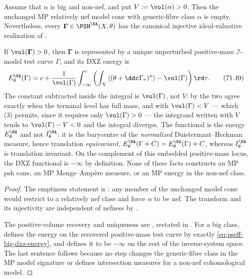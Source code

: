 \begin{proposition}\label{prop:pseff-big-nonnef-surviving-core}
Assume that \(\alpha\) is big and non-nef, and put
\(V:=\vol(\alpha)>0\).  Then the unchanged MP relatively nef model cone
with generic-fibre class \(\alpha\) is empty.  Nevertheless, every
\(\boldsymbol\Gamma\in\PSH^{\NA}(X,\theta)\) has the canonical injective
ideal-valuative realization of
.

If \(\vol(\boldsymbol\Gamma)>0\), then
\(\boldsymbol\Gamma\) is represented by a unique unperturbed
positive-mass \(\mathcal I\)-model test curve \(\Gamma\), and its DXZ
energy is
\[
 E_\theta^{\NA}(\Gamma)
 =c+\frac1{\vol(\Gamma)}\int_{-\infty}^{c}
   \left(
    \int_X\left\langle
       (\theta+\ddc\Gamma_\tau)^n
    \right\rangle-\vol(\Gamma)
   \right)\rd\tau.
\tag{71.49}\label{eq:pseff-big-dxz-energy}
\]
The constant subtracted inside the integral is \(\vol(\Gamma)\), not \(V\):
by  the two agree exactly when the terminal
level has full mass, and with \(\vol(\Gamma)<V\) --- which
\,(3) permits, since it requires only
\(\vol(\Gamma)>0\) --- the integrand written with \(V\) tends to
\(\vol(\Gamma)-V<0\) and the integral diverges.  The functional is the
energy \(E^{\NA}_\theta\) and not \(I^{\NA}_\theta\): it is the barycentre
of the \emph{normalized} Duistermaat--Heckman measure, hence translation
\emph{equivariant}, \(E^{\NA}_\theta(\Gamma+C)=E^{\NA}_\theta(\Gamma)+C\),
whereas \(I^{\NA}_\theta\) is translation invariant.
On the complement of this embedded positive-mass locus, the DXZ
functional is \(-\infty\) by definition.  None of these facts constructs
an MP psh cone, an MP Monge--Amp\`ere measure, or an MP energy in the
non-nef class.
\end{proposition}

\begin{proof}
The emptiness statement is
: any member of the unchanged
model cone would restrict to a relatively nef class and force \(\alpha\)
to be nef.  The transform and its injectivity are independent of nefness
by
.

The positive-volume recovery and uniqueness are
\cite[Lemma~3.10]{Xia23Operations}, restated in
.  For a big
class, \cite[formula~(43)]{DXZ23} defines the energy on the recovered
positive-mass test curve by exactly
\eqref{eq:pseff-big-dxz-energy}, and defines it to be \(-\infty\) on the
rest of the inverse-system space.  The last sentence follows because no
step changes the generic-fibre class in the MP model signature or defines
intersection measures for a non-nef cohomological model.
\end{proof}

